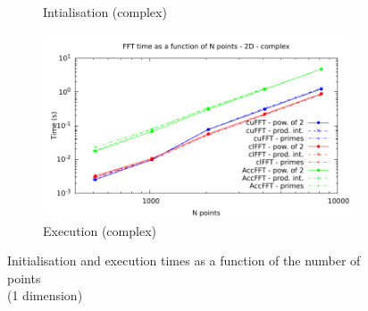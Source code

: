 \documentclass[12pt, a4paper]{article}
\begin{document}
\begin{figure}[H]
\begin{subfigure}{.5\textwidth}
\caption{Intialisation (complex)}
\label{FFT1DCI}
\end{subfigure}%
\begin{subfigure}{.5\textwidth}
\centering
\includegraphics[width=.9\linewidth]{graphs/fft-2d-c-exec.pdf}
\caption{Execution (complex)}
\label{FFT1DCE}
\end{subfigure}
\caption{Initialisation and execution times as a function of the number of points\\(1 dimension)}
\label{FFT1D}
\end{figure}
\end{document}
